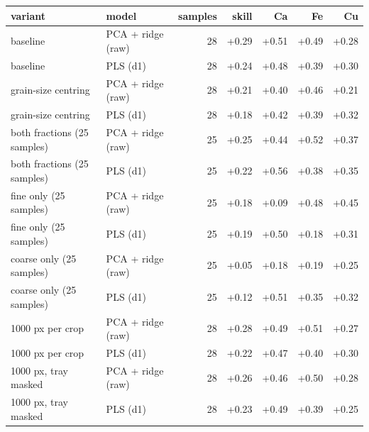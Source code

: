 \begin{tabular}{llrrrrr}
\toprule
variant & model & samples & skill & Ca & Fe & Cu \\
\midrule
baseline & PCA + ridge (raw) & 28 & +0.29 & +0.51 & +0.49 & +0.28 \\
baseline & PLS (d1) & 28 & +0.24 & +0.48 & +0.39 & +0.30 \\
grain-size centring & PCA + ridge (raw) & 28 & +0.21 & +0.40 & +0.46 & +0.21 \\
grain-size centring & PLS (d1) & 28 & +0.18 & +0.42 & +0.39 & +0.32 \\
both fractions (25 samples) & PCA + ridge (raw) & 25 & +0.25 & +0.44 & +0.52 & +0.37 \\
both fractions (25 samples) & PLS (d1) & 25 & +0.22 & +0.56 & +0.38 & +0.35 \\
fine only (25 samples) & PCA + ridge (raw) & 25 & +0.18 & +0.09 & +0.48 & +0.45 \\
fine only (25 samples) & PLS (d1) & 25 & +0.19 & +0.50 & +0.18 & +0.31 \\
coarse only (25 samples) & PCA + ridge (raw) & 25 & +0.05 & +0.18 & +0.19 & +0.25 \\
coarse only (25 samples) & PLS (d1) & 25 & +0.12 & +0.51 & +0.35 & +0.32 \\
1000 px per crop & PCA + ridge (raw) & 28 & +0.28 & +0.49 & +0.51 & +0.27 \\
1000 px per crop & PLS (d1) & 28 & +0.22 & +0.47 & +0.40 & +0.30 \\
1000 px, tray masked & PCA + ridge (raw) & 28 & +0.26 & +0.46 & +0.50 & +0.28 \\
1000 px, tray masked & PLS (d1) & 28 & +0.23 & +0.49 & +0.39 & +0.25 \\
\bottomrule
\end{tabular}
